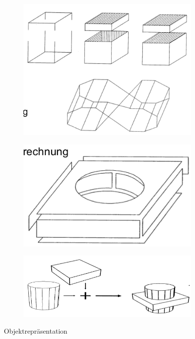 \begin{figure}[h!]
	\centering
	\begin{subfigure}{.25\textwidth}
		\includegraphics[width=\textwidth]{figures/ch02_kanten.png}
		\caption{}
	\end{subfigure}
	\begin{subfigure}{.25\textwidth}
		\includegraphics[width=\textwidth]{figures/ch02_flaechen.png}
		\caption{}
	\end{subfigure}
	\begin{subfigure}{.25\textwidth}
		\includegraphics[width=\textwidth]{figures/ch02_volumen.png}
		\caption{}
	\end{subfigure}
	\caption{Objektrepr\"{a}sentation}
	\label{fig:obrepr}
\end{figure}
